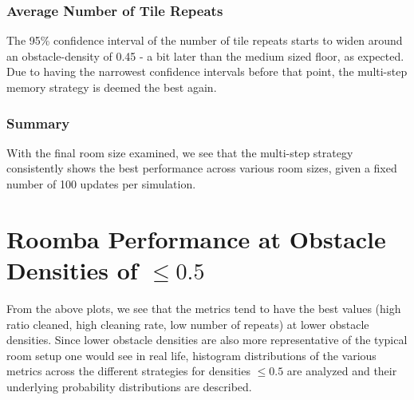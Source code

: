 \documentclass[11pt]{article}
\begin{document}
 \subsubsection*{Average Number of Tile Repeats}

The 95\% confidence interval of the number of tile repeats starts to
widen around an obstacle-density of 0.45 - a bit later than the medium
sized floor, as expected. Due to having the narrowest confidence
intervals before that point, the multi-step memory strategy is deemed
the best again.

 \subsubsection{Summary}

With the final room size examined, we see that the multi-step strategy
consistently shows the best performance across various room sizes, given
a fixed number of 100 updates per simulation.
\newpage
   \section{ Roomba Performance at Obstacle Densities of \(\leq 0.5\)}

From the above plots, we see that the metrics tend to have the best
values (high ratio cleaned, high cleaning rate, low number of repeats)
at lower obstacle densities. Since lower obstacle densities are also
more representative of the typical room setup one would see in real
life, histogram distributions of the various metrics across the
different strategies for densities \(\leq 0.5\) are analyzed and their
underlying probability distributions are described.
\end{document}
